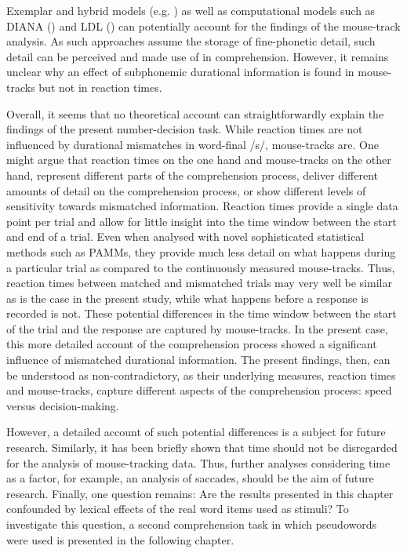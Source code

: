 Exemplar and hybrid models (e.g. \cite{Goldinger1996, Hawkins2001, Pierrehumbert2002, Hanique2013Aalders}) as well as computational models such as DIANA (\cite{tenBosch2015, tenBosch2021}) and LDL (\cite{Baayen2019}) can potentially account for the findings of the mouse-track analysis. As such approaches assume the storage of fine-phonetic detail, such detail can be perceived and made use of in comprehension. However, it remains unclear why an effect of subphonemic durational information is found in mouse-tracks but not in reaction times.

Overall, it seems that no theoretical account can straightforwardly explain the findings of the present number-decision task. While reaction times are not influenced by durational mismatches in word-final /s/, mouse-tracks are. One might argue that reaction times on the one hand and mouse-tracks on the other hand, represent different parts of the comprehension process, deliver different amounts of detail on the comprehension process, or show different levels of sensitivity towards mismatched information. Reaction times provide a single data point per trial and allow for little insight into the time window between the start and end of a trial. Even when analysed with novel sophisticated statistical methods such as PAMMs, they provide much less detail on what happens during a particular trial as compared to the continuously measured mouse-tracks. Thus, reaction times between matched and mismatched trials may very well be similar as is the case in the present study, while what happens before a response is recorded is not. These potential differences in the time window between the start of the trial and the response are captured by mouse-tracks. In the present case, this more detailed account of the comprehension process showed a significant influence of mismatched durational information. The present findings, then, can be understood as non-contradictory, as their underlying measures, reaction times and mouse-tracks, capture different aspects of the comprehension process: speed versus decision-making.

However, a detailed account of such potential differences is a subject for future research. Similarly, it has been briefly shown that time should not be disregarded for the analysis of mouse-tracking data. Thus, further analyses considering time as a factor, for example, an analysis of saccades, should be the aim of future research. Finally, one question remains: Are the results presented in this chapter confounded by lexical effects of the real word items used as stimuli? To investigate this question, a second comprehension task in which pseudowords were used is presented in the following chapter.
